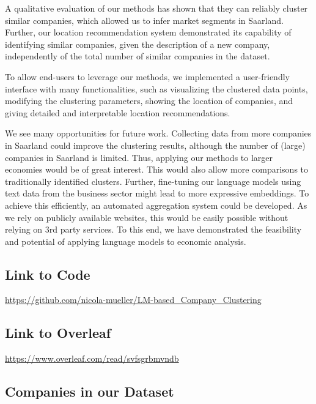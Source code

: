 \documentclass[conference]{IEEEtran}
\begin{document}
A qualitative evaluation of our methods has shown that they can reliably cluster similar companies, which allowed us to infer market segments in Saarland. Further, our location recommendation system demonstrated its capability of identifying similar companies, given the description of a new company, independently of the total number of similar companies in the dataset.

To allow end-users to leverage our methods, we implemented a user-friendly interface with many functionalities, such as visualizing the clustered data points, modifying the clustering parameters, showing the location of companies, and giving detailed and interpretable location recommendations.

We see many opportunities for future work. Collecting data from more companies in Saarland could improve the clustering results, although the number of (large) companies in Saarland is limited. Thus, applying our methods to larger economies would be of great interest. This would also allow more comparisons to traditionally identified clusters. Further, fine-tuning our language models using text data from the business sector might lead to more expressive embeddings. To achieve this efficiently, an automated aggregation system could be developed. As we rely on publicly available websites, this would be easily possible without relying on 3rd party services.
To this end, we have demonstrated the feasibility and potential of applying language models to economic analysis.





\newpage
\appendix

\subsection{Link to Code}
\url{https://github.com/nicola-mueller/LM-based_Company_Clustering}

\subsection{Link to Overleaf}
\url{https://www.overleaf.com/read/svfsgrbmvndb}


\subsection{Companies in our Dataset}
\label{sec:appendix-companies}
\end{document}
